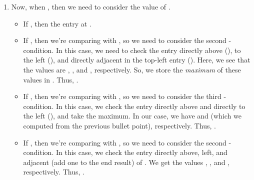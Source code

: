 \documentclass[letterpaper]{article}
\begin{document}
\begin{mdframed}[]
\begin{enumerate}
        \item Now, when , then we need to consider the value of . 
        \begin{itemize}
            \item If , then the entry at .
            
            \item If , then we're comparing  with , so we need to consider the second -condition. In this case, we need to check the entry directly above (), to the left (), and directly adjacent in the top-left entry (). Here, we see that the values are , , and , respectively. So, we store the \emph{maximum} of these values in . Thus, . 
            
            \item If , then we're comparing  with , so we need to consider the third -condition. In this case, we check the entry directly above  and directly to the left (), and take the maximum. In our case, we have  and  (which we computed from the previous bullet point), respectively. Thus, .
            
            \item If , then we're comparing  with , so we need to consider the second -condition. In this case, we check the entry directly above, left, and adjacent (add one to the end result) of \code{[i, j] = [1, 3]}. We get the values , , and , respectively. Thus, .  
            

\end{itemize}
\end{enumerate}
\end{mdframed}
\end{document}
